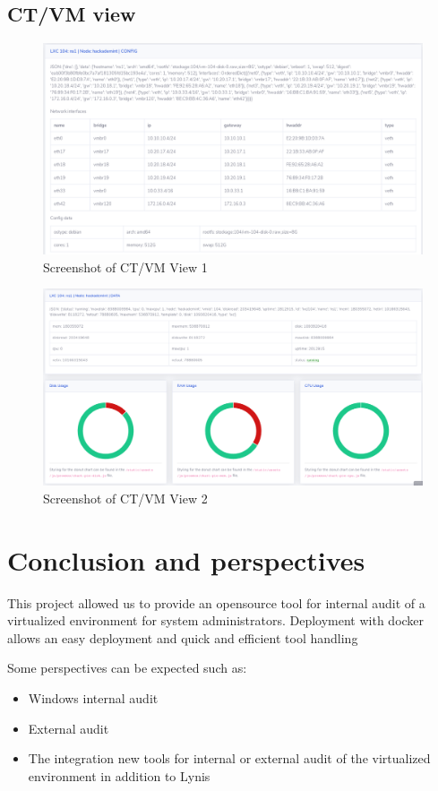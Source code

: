 \pagebreak

\subsection{CT/VM view}

\begin{figure}[!h]
  \centering
  \includegraphics[width=1.05\textwidth]{images/flask-application-2.png}
  \caption{Screenshot of CT/VM View 1}
  \label{CTView}
\end{figure}

\begin{figure}[!h]
  \centering
  \includegraphics[width=1.05\textwidth]{images/flask-application-3.png}
  \caption{Screenshot of CT/VM View 2}
  \label{CTView2}
\end{figure}

\pagebreak

\section{Conclusion and perspectives}


This project allowed us to provide an opensource tool for internal audit of a virtualized environment for system administrators.
Deployment with docker allows an easy deployment and quick and efficient tool handling

Some perspectives can be expected such as:
\begin{itemize}
  \item{Windows internal audit}
  \item{External audit}
  \item{The integration new tools for internal or external audit of the virtualized environment in addition to Lynis}
\end{itemize}



